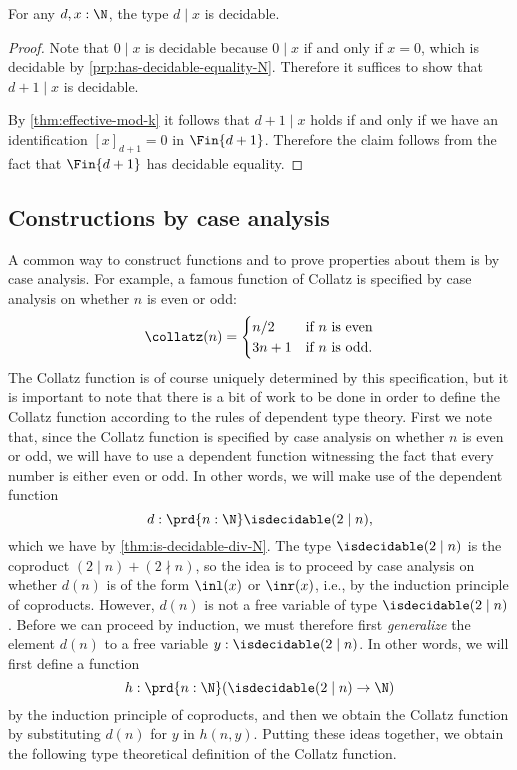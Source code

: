 \begin{thm}\label{thm:is-decidable-div-N}
  For any $d,x:\N$, the type $d\mid x$ is decidable.
\end{thm}

\begin{proof}
  Note that $0\mid x$ is decidable because $0\mid x$ if and only if $x=0$, which is decidable by \cref{prp:has-decidable-equality-N}. Therefore it suffices to show that $d+1\mid x$ is decidable.

  By \cref{thm:effective-mod-k} it follows that $d+1\mid x$ holds if and only if we have an identification $[x]_{d+1}=0$ in $\Fin{d+1}$. Therefore the claim follows from the fact that $\Fin{d+1}$ has decidable equality.
\end{proof}

\subsection{Constructions by case analysis}

A common way to construct functions and to prove properties about them is by case analysis. For example, a famous function of Collatz is specified by case analysis on whether $n$ is even or odd:
  \begin{equation*}
  \collatz(n) =
  \begin{cases}
    n/2 & \text{if $n$ is even}\\
    3n+1 & \text{if $n$ is odd.}
  \end{cases}
\end{equation*}
The Collatz function is of course uniquely determined by this specification, but it is important to note that there is a bit of work to be done in order to define the Collatz function according to the rules of dependent type theory. First we note that, since the Collatz function is specified by case analysis on whether $n$ is even or odd, we will have to use a dependent function witnessing the fact that every number is either even or odd. In other words, we will make use of the dependent function
\begin{equation*}
  d:\prd{n:\N}\isdecidable(2\mid n),
\end{equation*}
which we have by \cref{thm:is-decidable-div-N}. The type $\isdecidable(2\mid n)$ is the coproduct $(2\mid n)+(2\nmid n)$, so the idea is to proceed by case analysis on whether $d(n)$ is of the form $\inl(x)$ or $\inr(x)$, i.e., by the induction principle of coproducts. However, $d(n)$ is not a free variable of type $\isdecidable(2\mid n)$. Before we can proceed by induction, we must therefore first \emph{generalize} the element $d(n)$ to a free variable $y:\isdecidable(2\mid n)$. In other words, we will first define a function
\begin{equation*}
  h:\prd{n:\N} (\isdecidable(2\mid n)\to\N)
\end{equation*}
by the induction principle of coproducts, and then we obtain the Collatz function by substituting $d(n)$ for $y$ in $h(n,y)$. Putting these ideas together, we obtain the following type theoretical definition of the Collatz function.

